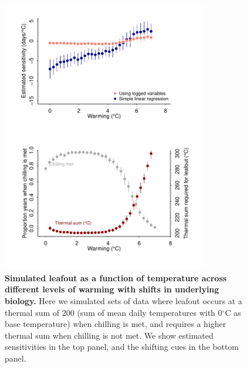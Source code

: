 \documentclass[11pt]{article}
\begin{document}
\begin{figure}[h!]
\centering
\noindent \includegraphics[width=0.8\textwidth]{..//analyses/figures/shiftingcuessims_2panels.pdf}
\caption{\textbf{Simulated leafout as a function of temperature across different levels of warming with shifts in underlying biology.} Here we simulated sets of data where leafout occurs at a thermal sum of 200 (sum of mean daily temperatures with 0$^{\circ}$C as base temperature) when chilling is met, and requires a higher thermal sum when chilling is not met. We show estimated sensitivities in the top panel, and the shifting cues in the bottom panel. } %
\label{fig:simsshiftcues} %
\end{figure}
\end{document}
